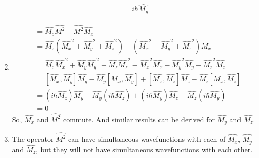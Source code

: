 \begin{solution}
\begin{enumerate}
\begin{align*}
                  [\hat{M_z},\hat{M_x}]=i \hbar \hat{M_y}
              \end{align*}
        \item \begin{align*}
                  [\hat{M_x},\hat{M^2}] & =\hat{M_x}\hat{M^2}-\hat{M^2}\hat{M_x}                                                                       \\
                                        & =\hat{M_x}(\hat{M_x}^2+\hat{M_y}^2+\hat{M_z}^2)-(\hat{M_x}^2+\hat{M_y}^2+\hat{M_z}^2)\hat{M_x}               \\
                                        & =\hat{M_x}\hat{M_x}^2+\hat{M_y}\hat{M_y}^2+\hat{M_z}\hat{M_z}^2-\hat{M_x}^2\hat{M_x}
                  -\hat{M_y}^2\hat{M_y}-\hat{M_z}^2\hat{M_z}                                                                                           \\
                                        & =[\hat{M_x},\hat{M_y}]\hat{M_y}-\hat{M_y}[\hat{M_x},\hat{M_y}]+[\hat{M_x},\hat{M_z}]\hat{M_z}
                  -\hat{M_z}[\hat{M_x},\hat{M_z}]                                                                                                      \\
                                        & =(i\hbar\hat{M_z})\hat{M_y}-\hat{M_y}(i\hbar\hat{M_z})+(i\hbar\hat{M_y})\hat{M_z}-\hat{M_z}(i\hbar\hat{M_y}) \\
                                        & =0
              \end{align*}
              So, $\hat{M_x}$ and $\hat{M^2}$ commute. And similar results can be derived for $\hat{M_y}$ and $\hat{M_z}$.
        \item The operator $\hat{M^2}$ can have simultaneous wavefunctions with each of $\hat{M_x}$, $\hat{M_y}$ and $\hat{M_z}$,
              but they will not have simultaneous wavefunctions with each other.
    \end{enumerate}
\end{solution}